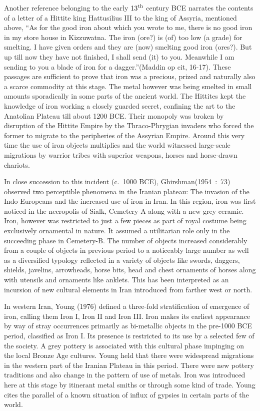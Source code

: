 Another reference belonging to the early $13^{\rm th}$ century BCE narrates the contents of a letter of a Hittite king Hattusilius III to the king of Assyria, mentioned above, “As for the good iron about which you wrote to me, there is no good iron in my store house in Kizzuwatna. The iron (ore?) is (of) too low (a grade) for smelting. I have given orders and they are (now) smelting good iron (ores?). But up till now they have not finished, I shall send (it) to you. Meanwhile I am sending to you a blade of iron for a dagger.”(Maddin op cit, 16-17). These passages are sufficient to prove that iron was a precious, prized and naturally also a scarce commodity at this stage. The metal however was being smelted in small amounts sporadically in some parts of the ancient world. The Hittites kept the knowledge of iron working a closely guarded secret, confining the art to the Anatolian Plateau till about 1200 BCE. Their monopoly was broken by disruption of the Hittite Empire by the Thraco-Phrygian invaders who forced the former to migrate to the peripheries of the Assyrian Empire. Around this very time the use of iron objects multiplies and the world witnessed large-scale migrations by warrior tribes with superior weapons, horses and horse-drawn chariots.

In close succession to this incident (c.~1000 BCE), Ghirshman\break (1954~:~73) observed two perceptible phenomena in the Iranian plateau: The invasion of the Indo-Europeans and the increased use of iron in Iran. In this region, iron was first noticed in the necropolis of Sialk, Cemetery-A along with a new grey ceramic. Iron, however was restricted to just a few pieces as part of royal costume being exclusively ornamental in nature. It assumed a utilitarian role only in the succeeding phase in Cemetery-B. The number of objects increased considerably from a couple of objects in previous period to a noticeably large number as well as a diversified typology reflected in a variety of objects like swords, daggers, shields, javelins, arrowheads, horse bits, head and chest ornaments of horses along with utensils and ornaments like anklets. This has been interpreted as an incursion of new cultural elements in Iran introduced from farther west or north.

In western Iran, Young (1976) defined a three-fold stratification of emergence of iron, calling them Iron I, Iron II and Iron III. Iron makes its earliest appearance by way of stray occurrences primarily as bi-metallic objects in the pre-1000 BCE period, classified as Iron I. Its presence is restricted to its use by a selected few of the society. A grey pottery is associated with this cultural phase impinging on the local Bronze Age cultures. Young held that there were widespread migrations in the western part of the Iranian Plateau in this period. There were new pottery traditions and also change in the pattern of use of metals. Iron was introduced here at this stage by itinerant metal smiths or through some kind of trade. Young cites the parallel of a known situation of influx of gypsies in certain parts of the world.


